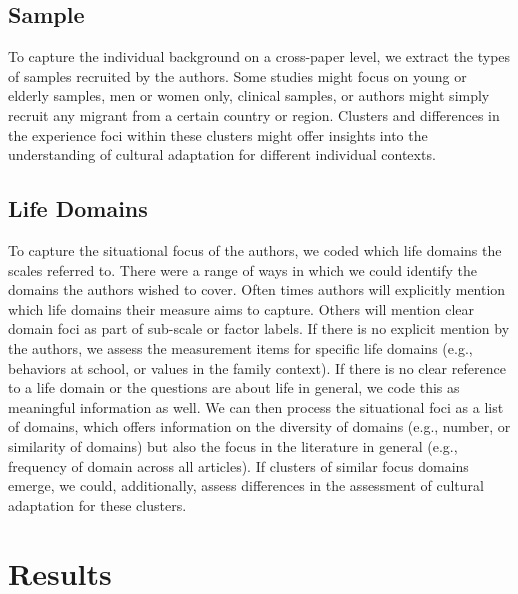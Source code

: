 \documentclass[man, 12pt, a4paper]{apa7}
\begin{document}
\subsection{Sample}
To capture the individual background on a cross-paper level, we extract the types of samples recruited by the authors. Some studies might focus on young or elderly samples, men or women only, clinical samples, or authors might simply recruit any migrant from a certain country or region. Clusters and differences in the experience foci within these clusters might offer insights into the understanding of cultural adaptation for different individual contexts.

\subsection{Life Domains}
To capture the situational focus of the authors, we coded which life domains the scales referred to. There were a range of ways in which we could identify the domains the authors wished to cover. Often times authors will explicitly mention which life domains their measure aims to capture. Others will mention clear domain foci as part of sub-scale or factor labels. If there is no explicit mention by the authors, we assess the measurement items for specific life domains (e.g., behaviors at school, or values in the family context). If there is no clear reference to a life domain or the questions are about life in general, we code this as meaningful information as well. We can then process the situational foci as a list of domains, which offers information on the diversity of domains (e.g., number, or similarity of domains) but also the focus in the literature in general (e.g., frequency of domain across all articles). If clusters of similar focus domains emerge, we could, additionally, assess differences in the assessment of cultural adaptation for these clusters.

\section{Results}


\printbibliography
\end{document}
